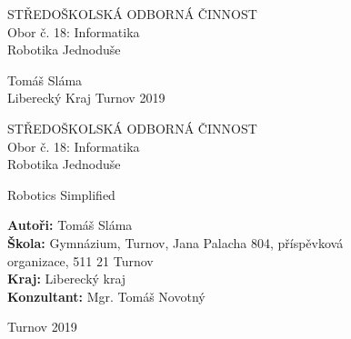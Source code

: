 \documentclass[a4paper, 12pt]{article}
\begin{document}

  \bfseries

  \begin{center}
    {\fontsize{18}{21.6} \selectfont STŘEDOŠKOLSKÁ ODBORNÁ ČINNOST}\\%
    \vspace*{\baselineskip}
    {\fontsize{14}{16.8} \selectfont Obor č. 18: Informatika}\\%

    \vspace{16em}
    {\fontsize{20}{24} \selectfont Robotika Jednoduše}%
    \vspace*{\fill}
  \end{center}

  \fontsize{16}{19.2} \selectfont
  Tomáš Sláma\\
  Liberecký Kraj
  \hfill
  Turnov 2019


  \newpage
  \begin{center}
    {\fontsize{18}{21.6} \selectfont STŘEDOŠKOLSKÁ ODBORNÁ ČINNOST}\\%
    \vspace*{\baselineskip}
    {\fontsize{14}{16.8} \selectfont Obor č. 18: Informatika}\\%

    \vspace{10em}
    \fontsize{20}{24} \selectfont
    Robotika Jednoduše%

    Robotics Simplified%
    \vspace*{\fill}
  \end{center}

  \normalfont
  \fontsize{16}{19.6} \selectfont

  \textbf{Autoři:} Tomáš Sláma\\
  \textbf{Škola:} Gymnázium, Turnov, Jana Palacha 804, příspěvková \\ organizace, 511 21 Turnov \\
  \textbf{Kraj:} Liberecký kraj \\
  \textbf{Konzultant:} Mgr. Tomáš Novotný

  \vspace{\baselineskip}

  \fontsize{12}{14.4} \selectfont
  Turnov 2019
\end{document}

